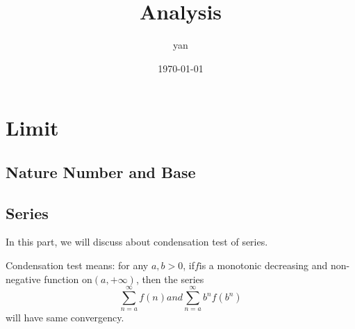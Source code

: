 \documentclass{book}
\title{Analysis}
\author{yan}
\date{\today}
\begin{document}
\frontmatter
\maketitle
\tableofcontents

\mainmatter
\part{Limit}
\chapter{Nature Number and Base}
\chapter{Series}

In this part, we will discuss about condensation test of series.

Condensation test means: for any $a, b > 0$, if$f$is a monotonic decreasing and non-negative function on$(a,+\infty)$, then the series
\begin{equation}
\sum_{n=a}^{\infty} f(n) and \sum_{n=a}^{\infty} b^nf(b^n)
\end{equation}
will have same convergency.
\end{document}
